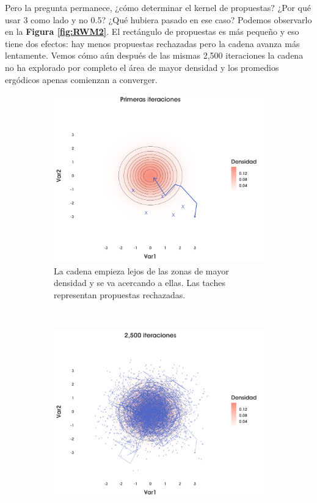 Pero la pregunta permanece, ¿cómo determinar el kernel de propuestas? ¿Por qué usar $3$ como lado y no $0.5$? ¿Qué hubiera pasado en ese caso? Podemos observarlo en la \textbf{Figura \ref{fig:RWM2}}. El rectángulo de propuestas es más pequeño y eso tiene dos efectos: hay menos propuestas rechazadas pero la cadena avanza más lentamente. Vemos cómo aún después de las mismas 2,500 iteraciones la cadena no ha explorado por completo el área de mayor densidad y los promedios ergódicos apenas comienzan a converger.\\ 

\begin{figure}[h]
    \centering
    \begin{subfigure}{0.3\textwidth}
        \includegraphics[width=\textwidth]{Figs/Bayes/Ejemplo_RWM_A}
        \caption{La cadena empieza lejos de las zonas de mayor densidad y se va acercando a ellas. Las taches representan propuestas rechazadas.}
    \end{subfigure}
    ~ 
    \begin{subfigure}{0.3\textwidth}
        \includegraphics[width=\textwidth]{Figs/Bayes/Ejemplo_RWM_B}

\end{subfigure}
\end{figure}
